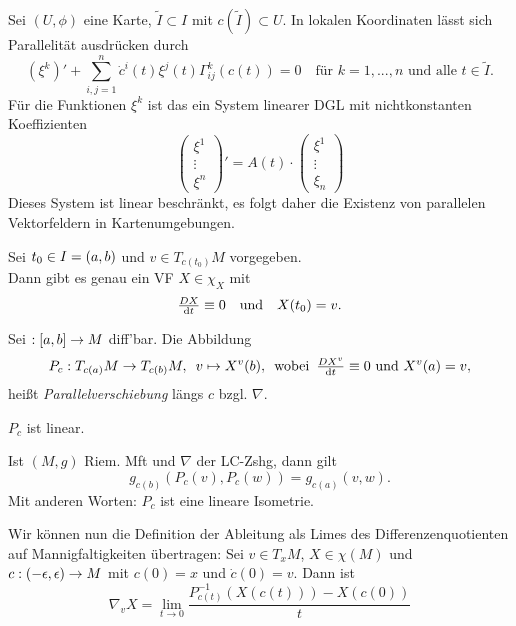\documentclass{cheat-sheet}
\newcommand{\coord}[1]{\tfrac{\partial^\phi}{\partial x^{#1}}} %
\newcommand{\abinterval}{\cinterval{a}{b}} %
\begin{document}
\begin{bem}
  Sei $(U, \phi)$ eine Karte, $\tilde{I} \subset I$ mit $c(\tilde{I}) \subset U$.
  In lokalen Koordinaten lässt sich Parallelität ausdrücken durch
  \[
    (\xi^{k})' + \sum_{i,j=1}^n \dot{c}^i(t) \xi^j (t) \Gamma_{ij}^k(c(t)) = 0
    \quad \text{für $k = 1, ..., n$ und alle $t \in \tilde{I}$.}
  \]
  Für die Funktionen $\xi^k$ ist das ein System linearer DGL mit nichtkonstanten Koeffizienten
  \[
    \begin{pmatrix}
      \xi^1 \\
      \vdots \\
      \xi^n
    \end{pmatrix}' = A(t) \cdot
    \begin{pmatrix}
      \xi^1 \\
      \vdots \\
      \xi_n
    \end{pmatrix}
  \]
  Dieses System ist linear beschränkt, es folgt daher die Existenz von parallelen Vektorfeldern in Kartenumgebungen.
\end{bem}

\begin{satz}
  Sei $t_0 \in I = \left( a, b \right)$ und $v \in T_{c(t_0)} M$ vorgegeben. \\
  Dann gibt es genau ein VF $X \in \chi_X$ mit
  \[
    \tfrac{D X}{\mathrm{d} t} \equiv 0
    \quad \text{und} \quad
    X(t_0) = v.
  \]
\end{satz}

\begin{defn}
  Sei $ : \abinterval \to M$ diff'bar. Die Abbildung
  \[
    P_c : T_{c(a)} M \to T_{c(b)} M, \enspace v \mapsto X^{v}(b),
    \enspace \text{wobei} \enspace \tfrac{D X^v}{\mathrm{d} t} \equiv 0 \text{ und } X^{v}(a) = v,
  \]
  heißt \emph{Parallelverschiebung} längs $c$ bzgl. $\nabla$.
\end{defn}

\begin{satz}
  $P_c$ ist linear.
\end{satz}

\begin{satz}
  Ist $(M, g)$ Riem. Mft und $\nabla$ der LC-Zshg, dann gilt
  \[ g_{c(b)}(P_c(v), P_c(w)) = g_{c(a)}(v, w). \]
  Mit anderen Worten: $P_c$ ist eine lineare Isometrie.
\end{satz}

\begin{bem}
  Wir können nun die Definition der Ableitung als Limes des Differenzenquotienten auf Mannigfaltigkeiten übertragen: Sei $v \in T_x M$, $X \in \chi(M)$ und $c : \left( -\epsilon, \epsilon \right) \to M$ mit $c(0) = x$ und $\dot{c}(0) = v$. Dann ist
  \[ \nabla_v X = \lim_{t \to 0} \frac{P_{c(t)}^{-1}(X(c(t))) - X(c(0))}{t} \]
\end{bem}
\end{document}

